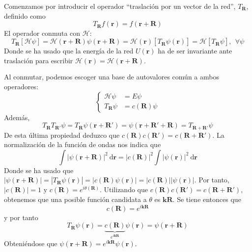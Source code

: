 \begin{boldproof}
 Comenzamos por introducir el operador ``traslación por un vector de
 la red'', $T_\mathbf{R}$, definido como
\begin{equation}
  T_\mathbf{R} f(\mathbf{r}) = f(\mathbf{r}+\mathbf{R})
\end{equation}
El operador conmuta con $\mathcal{H}$:
\begin{equation}
  T_\mathbf{R}[ \mathcal{H}\psi ] = \mathcal{H}(\mathbf{r} + \mathbf{R})
  \psi(\mathbf{r}+\mathbf{R}) = \mathcal{H}(\mathbf{r})
  [T_\mathbf{R}\psi(\mathbf{r})] = \mathcal{H} [T_\mathbf{R}\psi], \ \ \forall \psi
\end{equation}
Donde se ha usado que la energía de la red $U(\mathbf{r})$ ha de ser
invariante ante traslación para escribir $\mathcal{H}(\mathbf{r}) = \mathcal{H}(\mathbf{r}+\mathbf{R})$.

Al conmutar, podemos escoger una base de autovalores común a ambos
operadores:
\begin{equation}
  \begin{cases}
    \mathcal{H} \psi &= E \psi \\
    T_\mathbf{R} \psi &= c(\mathbf{R}) \psi
  \end{cases}
\end{equation}
Además,
\begin{equation}
  T_\mathbf{R}T_\mathbf{R'} \psi =
  T_\mathbf{R}\psi(\mathbf{r}+\mathbf{R'}) =
  \psi(\mathbf{r}+\mathbf{R'}+\mathbf{R}) = T_{\mathbf{R+R'}}\psi
\end{equation}
De esta última propiedad deduzco que $c(\mathbf{R})c(\mathbf{R'}) =
c(\mathbf{R}+\mathbf{R'})$. La normalización de la función de ondas
nos indica que
\begin{equation}
  \int |\psi(\mathbf{r}+\mathbf{R})|^2 \ \text{d}\mathbf{r} = |
  c(\mathbf{R}) |^2 \int |\psi(\mathbf{r})|^2 \ \text{d}\mathbf{r}
\end{equation}
Donde se ha usado que $|\psi(\mathbf{r}+\mathbf{R})| = | T_\mathbf{R}
\psi(\mathbf{r})| = | c(\mathbf{R}) \psi(\mathbf{r})| = |
c(\mathbf{R}) ||\psi(\mathbf{r})|$. Por tanto, $|c(\mathbf{R})| = 1$ y
$c(\mathbf{R}) = e^{i \theta (\mathbf{R})}$. Utilizando que $c(\mathbf{R})c(\mathbf{R'}) =
c(\mathbf{R}+\mathbf{R'})$, obtenemos que una posible función
candidata a $\theta$ es $\mathbf{k}\mathbf{R}$. Se tiene entonces que
\begin{equation}
  c(\mathbf{R}) = e^{i \mathbf{k}\mathbf{R}}
\end{equation}
y por tanto
\begin{equation}
  T_\mathbf{R} \psi(\mathbf{r}) = \underbrace{c(\mathbf{R})}_{e^{i
      \mathbf{k} \mathbf{R}}}\psi(\mathbf{r}) = \psi(\mathbf{r}+\mathbf{R})
\end{equation}
Obteniéndose que $\psi(\mathbf{r}+\mathbf{R}) = e^{i
  \mathbf{k}\mathbf{R}} \psi (\mathbf{r})$.
\end{boldproof}

